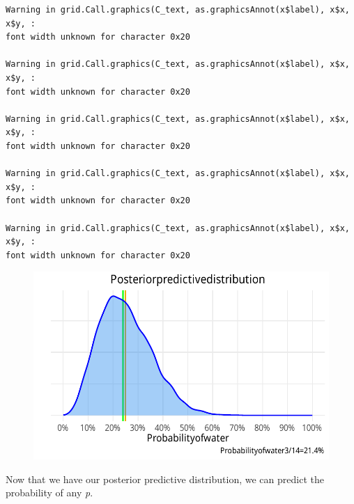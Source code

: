 \documentclass[
  letterpaper,
  DIV=11,
  numbers=noendperiod,
  oneside]{scrartcl}
\begin{document}
\begin{verbatim}
Warning in grid.Call.graphics(C_text, as.graphicsAnnot(x$label), x$x, x$y, :
font width unknown for character 0x20

Warning in grid.Call.graphics(C_text, as.graphicsAnnot(x$label), x$x, x$y, :
font width unknown for character 0x20

Warning in grid.Call.graphics(C_text, as.graphicsAnnot(x$label), x$x, x$y, :
font width unknown for character 0x20

Warning in grid.Call.graphics(C_text, as.graphicsAnnot(x$label), x$x, x$y, :
font width unknown for character 0x20

Warning in grid.Call.graphics(C_text, as.graphicsAnnot(x$label), x$x, x$y, :
font width unknown for character 0x20
\end{verbatim}

\begin{figure}[H]

{\centering \includegraphics{rethinking2024wk1_files/figure-pdf/unnamed-chunk-19-1.pdf}

}

\end{figure}

Now that we have our posterior predictive distribution, we can predict
the probability of any \emph{p}.
\end{document}

